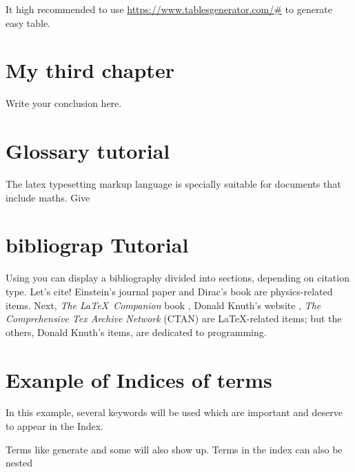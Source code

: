 It high recommended to use {\url{https://www.tablesgenerator.com/#}} to generate easy table.




\chapter{My third chapter}

Write your conclusion here.






\chapter{Glossary tutorial}

 The \Gls{latex} typesetting markup language is specially suitable 
for documents that include \gls{maths}. Give



\chapter{bibliograp Tutorial}

Using you can display a bibliography divided into sections, depending on citation type. 
Let's cite! Einstein's journal paper \cite{einstein} and Dirac's book \cite{dirac} are physics-related items. 
Next, \textit{The \LaTeX\ Companion} book \cite{latexcompanion}, Donald Knuth's website \cite{knuthwebsite}, \textit{The Comprehensive Tex Archive Network} (CTAN) \cite{ctan} are \LaTeX-related items; but the others, Donald Knuth's items, \cite{knuth-fa,knuth-acp} are dedicated to programming.



\chapter{Exanple of Indices of terms}

In this example, several keywords will be 
used which are important and deserve to appear in the 
Index.

Terms like generate and some 
will also show up. Terms in the index can also be 
nested 